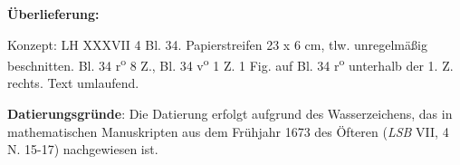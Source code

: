 \begin{ledgroupsized}[r]{120mm}
 \footnotesize 
 \pstart 
 \noindent\textbf{\"{U}berlieferung:}
 \pend
 \end{ledgroupsized}

  
 \begin{ledgroupsized}[r]{114mm}
 \footnotesize 
 \pstart \parindent -6mm
 Konzept: LH XXXVII 4 Bl. 34. Papierstreifen 23 x 6 cm, tlw. unregelm\"{a}{\ss}ig beschnitten. Bl. 34 r\textsuperscript{o} 8  Z., Bl. 34 v\textsuperscript{o} 1  Z. 1 Fig. auf Bl. 34 r\textsuperscript{o} unterhalb der 1. Z. rechts. Text umlaufend. \pend
 \end{ledgroupsized}
 \vspace*{5mm}
 \begin{ledgroup}
 \footnotesize 
 \pstart
\noindent\footnotesize{\textbf{Datierungsgr\"{u}nde}: Die Datierung erfolgt aufgrund des Wasserzeichens, das in mathematischen Manuskripten aus dem Fr\"{u}hjahr 1673 des \"{O}fteren (\textit{LSB} VII, 4 N. 15-17) nachgewiesen ist.}
 \pend
 \end{ledgroup}

